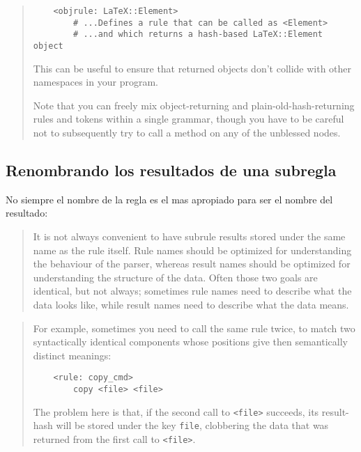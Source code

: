 \begin{it}
\begin{quotation}
\begin{verbatim}
    <objrule: LaTeX::Element> 
        # ...Defines a rule that can be called as <Element>
        # ...and which returns a hash-based LaTeX::Element object
\end{verbatim}

This can be useful to ensure that returned objects don't collide with
other namespaces in your program.

Note that you can freely mix object-returning and plain-old-hash-returning
rules and tokens within a single grammar, though you have to be careful
not to subsequently try to call a method on any of the unblessed nodes.

\end{quotation}\end{it}

\subsection{Renombrando los resultados de una subregla}

 
No siempre el nombre de la regla es el mas apropiado
para ser el nombre del resultado:

\begin{it}\begin{quotation}
It is not always convenient to have subrule results stored under the same
name as the rule itself. Rule names should be optimized for understanding
the behaviour of the parser, whereas result names should be optimized
for understanding the structure of the data. Often those two goals are
identical, but not always; sometimes rule names need to describe what the
data looks like, while result names need to describe what the data means.
\end{quotation}\end{it}


\begin{it}\begin{quotation}
For example, sometimes you need to call the same rule twice, to match two
syntactically identical components whose positions give then semantically
distinct meanings:

\begin{verbatim}
    <rule: copy_cmd>
        copy <file> <file>
\end{verbatim}

The problem here is that, if the second call to \verb|<file>| succeeds, its
result-hash will be stored under the key \verb'file', clobbering the data
that was returned from the first call to \verb|<file>|.
\end{quotation}\end{it}

